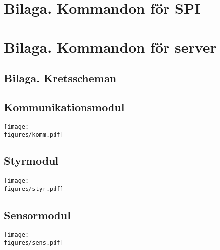 \documentclass[main.tex]{subfiles}
\begin{document}
\pagestyle{empty}

\begin{appendices}
    \newpage
    \section{Bilaga. Kommandon för SPI}
    \label{bcmds}
    

    \newpage
    \section{Bilaga. Kommandon för server}
    \label{scmds}
    

    \begin{landscape}
    \section{Bilaga. Kretsscheman}
    
    \subsection{Kommunikationsmodul}
    \label{cdiag:comm}
	    \texttt{[image: \\figures/komm.pdf]}

    \subsection{Styrmodul}
    \label{cdiag:ctrl}
	    \texttt{[image: \\figures/styr.pdf]}

    \subsection{Sensormodul}
    \label{cdiag:sens}
	    \texttt{[image: \\figures/sens.pdf]}

    \end{landscape}
\end{appendices}
\end{document}
